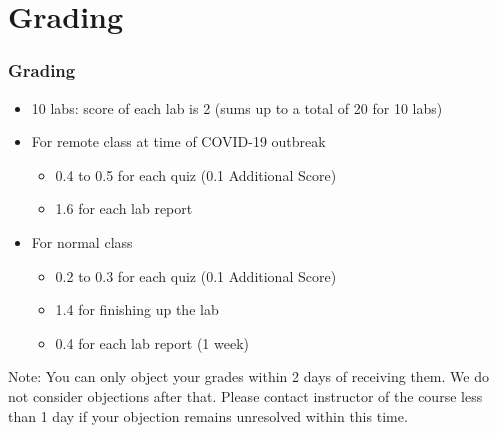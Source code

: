 \documentclass[aspectratio=169,15pt]{beamer}
\begin{document}
\section{Grading}
\begin{frame}
    \frametitle{Grading}

    \begin{itemize}
        \item 10 labs: score of each lab is \alert{2} (sums up to a total of \alert{20} for 10 labs)
        \item For remote class at time of \alert{COVID-19} outbreak
        \begin{itemize}
            \item {\color{red} 0.4} to {\color{red} 0.5} for each quiz (0.1 Additional Score)
            \item {\color{red} 1.6} for each lab report
        \end{itemize}
        \item For normal class
        \begin{itemize}
            \item {\color{red} 0.2} to {\color{red} 0.3} for each quiz (0.1 Additional Score)
            \item {\color{red} 1.4} for finishing up the lab
            \item {\color{red} 0.4} for each lab report (1 week)
        \end{itemize}
    \end{itemize}
    \begin{alertblock}{Note:}
        You can only object your grades within {\color{red} 2 days} of receiving them. We do not consider objections after that.
        Please contact instructor of the course less than {\color{red} 1 day} if your objection remains unresolved within this time.
    \end{alertblock}

\end{frame}
\end{document}
